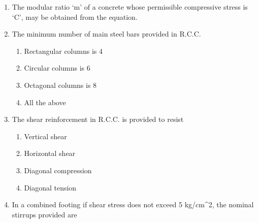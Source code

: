 \documentclass[11pt,a4paper]{article}
\begin{document}
\begin{enumerate}
\item{The modular ratio `m' of a concrete whose permissible compressive stress is `C', may be obtained from the equation.
}
\\
\item{The minimum number of main steel bars provided in R.C.C.}
\begin{enumerate}[label=\Alph*.]
\item{Rectangular columns is 4}
\item{Circular columns is 6}
\item{Octagonal columns is 8}
\item{All the above}
\end{enumerate}
\item{The shear reinforcement in R.C.C. is provided to resist}
\begin{enumerate}[label=\Alph*.]
\item{Vertical shear}
\item{Horizontal shear}
\item{Diagonal compression}
\item{Diagonal tension}
\end{enumerate}
\item{In a combined footing if shear stress does not exceed 5 kg/cm\^{}2, the nominal stirrups provided are
}
\\

\end{enumerate}
\end{document}
